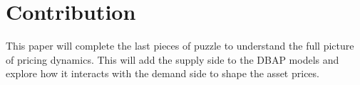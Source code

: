 \documentclass[a4paper]{article}
\begin{document}
\section*{Contribution}
This paper will complete the last pieces of puzzle to understand the full picture of pricing dynamics. This will add the supply side to the DBAP models and explore how it interacts with the demand side to shape the asset prices. 



	



	{
	\footnotesize
	
	
}
\end{document}
